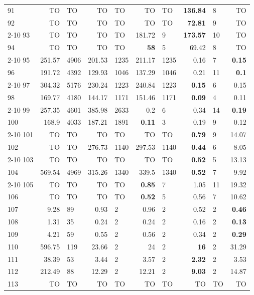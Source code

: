 \begin{longtable}{lr@{\hskip 4pt}l@{\hskip 12pt}r@{\hskip 4pt}l@{\hskip 12pt}r@{\hskip 4pt}l@{\hskip 12pt}r@{\hskip 4pt}l@{\hskip 12pt}r}
91 & TO & TO & TO & TO & TO & TO & \textbf{136.84} & 8 & TO \\
92 & TO & TO & TO & TO & TO & TO & \textbf{72.81} & 9 & TO \\
\cmidrule{2-10}
93 & TO & TO & TO & TO & 181.72 & 9 & \textbf{173.57} & 10 & TO \\
94 & TO & TO & TO & TO & \textbf{58} & 5 & 69.42 & 8 & TO \\
\cmidrule{2-10}
95 & 251.57 & 4906 & 201.53 & 1235 & 211.17 & 1235 & 0.16 & 7 & \textbf{0.15} \\
96 & 191.72 & 4392 & 129.93 & 1046 & 137.29 & 1046 & 0.21 & 11 & \textbf{0.1} \\
\cmidrule{2-10}
97 & 304.32 & 5176 & 230.24 & 1223 & 240.84 & 1223 & \textbf{0.15} & 6 & 0.15 \\
98 & 169.77 & 4180 & 144.17 & 1171 & 151.46 & 1171 & \textbf{0.09} & 4 & 0.11 \\
\cmidrule{2-10}
99 & 257.35 & 4601 & 385.98 & 2633 & 0.2 & 6 & 0.34 & 14 & \textbf{0.19} \\
100 & 168.9 & 4033 & 187.21 & 1891 & \textbf{0.11} & 3 & 0.19 & 9 & 0.12 \\
\cmidrule{2-10}
101 & TO & TO & TO & TO & TO & TO & \textbf{0.79} & 9 & 14.07 \\
102 & TO & TO & 276.73 & 1140 & 297.53 & 1140 & \textbf{0.44} & 6 & 8.05 \\
\cmidrule{2-10}
103 & TO & TO & TO & TO & TO & TO & \textbf{0.52} & 5 & 13.13 \\
104 & 569.54 & 4969 & 315.26 & 1340 & 339.5 & 1340 & \textbf{0.52} & 7 & 9.92 \\
\cmidrule{2-10}
105 & TO & TO & TO & TO & \textbf{0.85} & 7 & 1.05 & 11 & 19.32 \\
106 & TO & TO & TO & TO & \textbf{0.52} & 5 & 0.56 & 7 & 10.62 \\
\midrule
107 & 9.28 & 89 & 0.93 & 2 & 0.96 & 2 & 0.52 & 2 & \textbf{0.46} \\
108 & 1.31 & 35 & 0.24 & 2 & 0.24 & 2 & 0.16 & 2 & \textbf{0.13} \\
109 & 4.21 & 59 & 0.55 & 2 & 0.56 & 2 & 0.34 & 2 & \textbf{0.29} \\
110 & 596.75 & 119 & 23.66 & 2 & 24 & 2 & \textbf{16} & 2 & 31.29 \\
111 & 38.39 & 53 & 3.44 & 2 & 3.57 & 2 & \textbf{2.32} & 2 & 3.53 \\
112 & 212.49 & 88 & 12.29 & 2 & 12.21 & 2 & \textbf{9.03} & 2 & 14.87 \\
113 & TO & TO & TO & TO & TO & TO & TO & TO & TO \\

\end{longtable}
